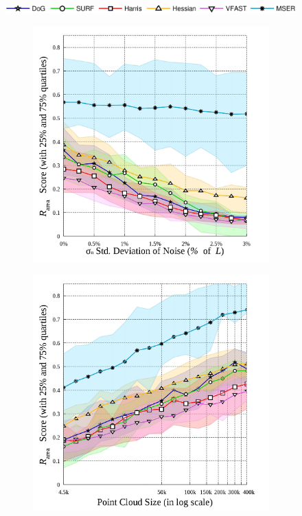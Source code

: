 \begin{figure}[ht]
	\centering 
	\includegraphics[width=0.70\linewidth]{./fig/eval/hlegend.jpg}
	\begin{subfigure}[t]{0.48\linewidth}
		\centering 
		\includegraphics[width=1\linewidth]{./fig/eval/graph_noise.jpg}
		\label{fig/eval/graph_noise}
	\end{subfigure}
	\begin{subfigure}[t]{0.48\linewidth}
		\centering 
		\includegraphics[width=1\linewidth]{./fig/eval/graph_sampling.jpg}

\end{subfigure}
\end{figure}
